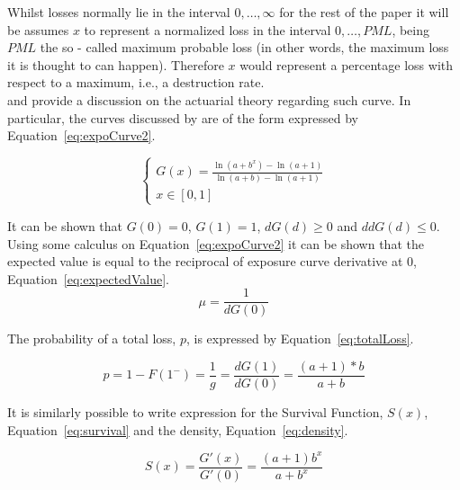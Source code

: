 \documentclass[nojss]{jss}
\begin{document}
Whilst losses normally lie in the interval $0,\ldots, \infty$ for the rest of the paper it will be assumes $x$ to represent a normalized loss in the interval $0,\ldots, PML$, being $PML$ the so - called maximum probable loss (in other words, the maximum loss it is thought to can happen). Therefore $x$ would represent a percentage loss with respect to a maximum, i.e., a destruction rate.\\


\cite{bernegger1997tile} and \cite{mahler} provide a discussion on the actuarial theory regarding such curve. In particular, the curves discussed by \cite{bernegger1997tile} are of the form expressed by Equation~\ref{eq:expoCurve2}.

\begin{equation}
\left\{ \begin{array}{l}
G\left( x \right) = \frac{{\ln \left( {a + {b^x}} \right) - \ln \left( {a + 1} \right)}}{{\ln \left( {a + b} \right) - \ln \left( {a + 1} \right)}}\\
x \in \left[ {0,1} \right]
\end{array} \right.
\label{eq:expoCurve2}
\end{equation}

It can be shown that $G \left( 0 \right)=0$, $G\left( 1 \right)=1$, $dG \left( d \right) \ge 0$ and $ddG \left( d \right) \le 0$. Using some calculus on Equation~\ref{eq:expoCurve2} it can be shown that the expected value is equal to the reciprocal of exposure curve derivative at 0, Equation~\ref{eq:expectedValue}.\\

\begin{equation}
  \mu = \frac{1}{dG \left( 0 \right) }
  \label{eq:expectedValue}
\end{equation}

The probability of a total loss, $p$, is expressed by Equation~\ref{eq:totalLoss}.

\begin{equation}
p = 1 - F\left( 1^{-}  \right) = \frac{1}{g} = \frac{dG\left( 1 \right)}{dG\left( 0 \right)} = \frac{\left( a + 1 \right)*b}{a + b}
\label{eq:totalLoss}
\end{equation}

It is similarly possible to write expression for the Survival Function, $S \left( x \right)$, Equation~\ref{eq:survival} and the density, Equation~\ref{eq:density}.

\begin{equation}
S\left( x \right) = \frac{{G'\left( x \right)}}{{G'\left( 0 \right)}} = \frac{{\left( {a + 1} \right){b^x}}}{{a + {b^x}}}
\label{eq:survival}
\end{equation}
\end{document}
